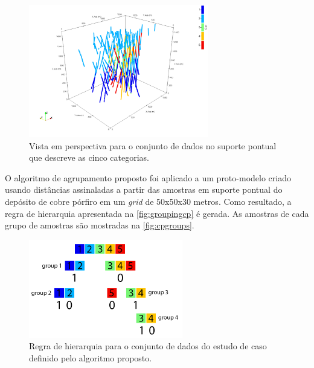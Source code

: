 \begin{figure}[H]
\caption{Vista em perspectiva para o conjunto de dados no suporte pontual que descreve as cinco categorias.}
\label{fig:pointscp}
\centering
\includegraphics[width=0.7\textwidth]{capitulo_3/imagens/pointscp.png}
\end{figure}

O algoritmo de agrupamento proposto foi aplicado a um proto-modelo criado usando distâncias assinaladas a partir das amostras em suporte pontual do depósito de cobre pórfiro em um \textit{grid} de 50x50x30 metros. Como resultado, a regra de hierarquia apresentada na \autoref{fig:groupingcp} é gerada. As amostras de cada grupo de amostras são mostradas na \autoref{fig:cpgroups}.

\begin{figure}[H]
\caption{Regra de hierarquia para o conjunto de dados do estudo de caso definido pelo algoritmo proposto.}
\label{fig:groupingcp}
\centering
\includegraphics[width=0.6\textwidth]{capitulo_3/imagens/groupingcp.png}
\end{figure}

